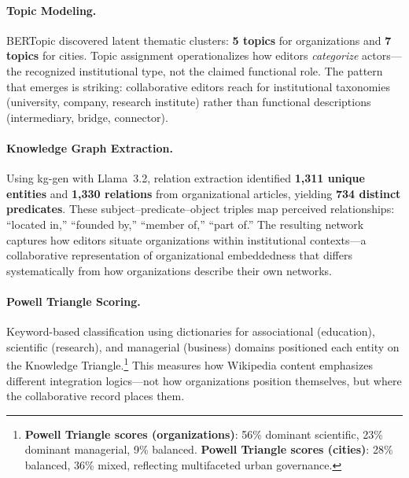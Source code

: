 \documentclass[../main.tex]{subfiles}
\begin{document}
\paragraph{Topic Modeling.} BERTopic \parencite{grootendorst2022bertopic} discovered latent thematic clusters: \textbf{5 topics} for organizations and \textbf{7 topics} for cities. Topic assignment operationalizes how editors \emph{categorize} actors---the recognized institutional type, not the claimed functional role. The pattern that emerges is striking: collaborative editors reach for institutional taxonomies (university, company, research institute) rather than functional descriptions (intermediary, bridge, connector).

\paragraph{Knowledge Graph Extraction.} Using kg-gen with Llama~3.2, relation extraction identified \textbf{1,311 unique entities} and \textbf{1,330 relations} from organizational articles, yielding \textbf{734 distinct predicates}. These subject--predicate--object triples map perceived relationships: ``located in,'' ``founded by,'' ``member of,'' ``part of.'' The resulting network captures how editors situate organizations within institutional contexts---a collaborative representation of organizational embeddedness that differs systematically from how organizations describe their own networks.

\paragraph{Powell Triangle Scoring.} Keyword-based classification using dictionaries for associational (education), scientific (research), and managerial (business) domains positioned each entity on the Knowledge Triangle.\footnote{\textbf{Powell Triangle scores (organizations)}: 56\% dominant scientific, 23\% dominant managerial, 9\% balanced. \textbf{Powell Triangle scores (cities)}: 28\% balanced, 36\% mixed, reflecting multifaceted urban governance.} This measures how Wikipedia content emphasizes different integration logics---not how organizations position themselves, but where the collaborative record places them.
\end{document}

